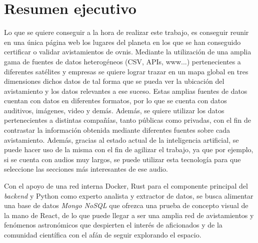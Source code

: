 \section{Resumen ejecutivo}

Lo que se quiere conseguir a la hora de realizar este trabajo, es conseguir reunir en una única página web los lugares del planeta en los que se han conseguido certificar o validar avistamientos de ovnis. Mediante la utilización de una amplia gama de fuentes de datos heterogéneos  (CSV, APIs, www...) pertenecientes a diferentes satélites y empresas se quiere lograr trazar en un mapa global en tres dimensiones dichos datos de tal forma que se pueda ver la ubicación del avistamiento y los datos relevantes a ese suceso.
Estas amplias fuentes de datos cuentan con datos en diferentes formatos, por lo que se cuenta con datos auditivos, imágenes, video y demás. Además, se quiere utilizar los datos pertenecientes a distintas compañías, tanto públicas como privadas, con el fin de contrastar la información obtenida mediante diferentes fuentes sobre cada avistamiento.
Además, gracias al estado actual de la inteligencia artificial, se puede hacer uso de la misma con el fin de agilizar el trabajo, ya que por ejemplo, si se cuenta con audios muy largos, se puede utilizar esta tecnología para que seleccione las secciones más interesantes de ese audio.

Con el apoyo de una red interna Docker, Rust para el componente principal del \textit{backend} y Python como experto analista y extractor de datos, se busca alimentar una base de datos \textit{Mongo NoSQL} que ofrezca una prueba de concepto visual de la mano de React, de lo que puede llegar a ser una amplia red de avistamientos y fenómenos astronómicos que despierten el interés de aficionados y de la comunidad científica con el afán de seguir explorando el espacio.
